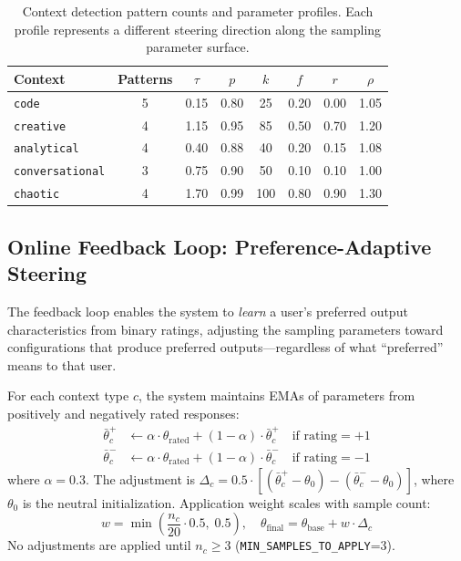 \documentclass[11pt]{article}
\begin{document}
\begin{table}[t]
\caption{Context detection pattern counts and parameter profiles. Each profile represents a different steering direction along the sampling parameter surface.}
\label{tab:patterns}
\label{tab:profiles}
\centering
\small
\begin{tabular}{@{}lc|cccccc@{}}
\toprule
Context & Patterns & $\tau$ & $p$ & $k$ & $f$ & $r$ & $\rho$ \\
\midrule
\texttt{code}           & 5 & 0.15 & 0.80 & 25 & 0.20 & 0.00 & 1.05 \\
\texttt{creative}       & 4 & 1.15 & 0.95 & 85 & 0.50 & 0.70 & 1.20 \\
\texttt{analytical}     & 4 & 0.40 & 0.88 & 40 & 0.20 & 0.15 & 1.08 \\
\texttt{conversational} & 3 & 0.75 & 0.90 & 50 & 0.10 & 0.10 & 1.00 \\
\texttt{chaotic}        & 4 & 1.70 & 0.99 & 100& 0.80 & 0.90 & 1.30 \\
\bottomrule
\end{tabular}
\end{table}

\subsection{Online Feedback Loop: Preference-Adaptive Steering}
\label{sec:feedback}

The feedback loop enables the system to \emph{learn} a user's preferred output characteristics from binary ratings, adjusting the sampling parameters toward configurations that produce preferred outputs---regardless of what ``preferred'' means to that user.

For each context type $c$, the system maintains EMAs of parameters from positively and negatively rated responses:
\begin{align}
    \bar{\theta}^+_c &\leftarrow \alpha \cdot \theta_{\text{rated}} + (1 - \alpha) \cdot \bar{\theta}^+_c \quad \text{if rating} = +1 \\
    \bar{\theta}^-_c &\leftarrow \alpha \cdot \theta_{\text{rated}} + (1 - \alpha) \cdot \bar{\theta}^-_c \quad \text{if rating} = -1
\end{align}
where $\alpha = 0.3$. The adjustment is $\Delta_c = 0.5 \cdot [(\bar{\theta}^+_c - \theta_0) - (\bar{\theta}^-_c - \theta_0)]$, where $\theta_0$ is the neutral initialization. Application weight scales with sample count:
\begin{equation}
    w = \min\!\left(\frac{n_c}{20} \cdot 0.5,\; 0.5\right), \quad
    \theta_{\text{final}} = \theta_{\text{base}} + w \cdot \Delta_c
\end{equation}
No adjustments are applied until $n_c \geq 3$ (\texttt{MIN\_SAMPLES\_TO\_APPLY}=3).
\end{document}
